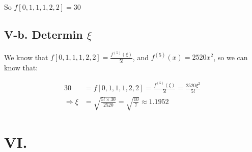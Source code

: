 \documentclass[a4paper]{article}
\begin{document}
So $f[0,1,1,1,2,2] = 30$

\subsection*{V-b. Determin $\xi$}
We know that $f[0,1,1,1,2,2] = \frac{f^{(5)}(\xi)}{5!}$, and $f^{(5)}(x) = 2520x^2$, so we can know that:

\begin{equation}
  \begin{aligned}
    30 &= f[0,1,1,1,2,2] = \frac{f^{(5)}(\xi)}{5!} = \frac{2520\xi^2}{5!} \\
    \Rightarrow \xi &= \sqrt{\frac{5! \times 30}{2520}} = \sqrt{\frac{10}{7}} \approx 1.1952
  \end{aligned}
\end{equation}

\section*{VI. }

\section*{  }

\end{document}
